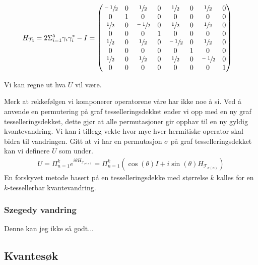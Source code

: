         \begin{align*}
            H_{\mathcal{T}_3} & = 2\Sigma_{i=1}^5\gamma_i\gamma_i^*-I = \begin{pmatrix}
                \sfrac{-1}{2} & 0 & \sfrac{1}{2} & 0 & \sfrac{1}{2} & 0 & \sfrac{1}{2} & 0 \\
                0 & 1 & 0 & 0 & 0 & 0 & 0 & 0 \\
                \sfrac{1}{2} & 0 & \sfrac{-1}{2} & 0 & \sfrac{1}{2} & 0 & \sfrac{1}{2} & 0 \\
                0 & 0 & 0 & 1 & 0 & 0 & 0 & 0 \\
                \sfrac{1}{2} & 0 & \sfrac{1}{2} & 0 & \sfrac{-1}{2} & 0 & \sfrac{1}{2} & 0 \\
                0 & 0 & 0 & 0 & 0 & 1 & 0 & 0 \\
                \sfrac{1}{2} & 0 & \sfrac{1}{2} & 0 & \sfrac{1}{2} & 0 & \sfrac{-1}{2} & 0 \\
                0 & 0 & 0 & 0 & 0 & 0 & 0 & 1
            \end{pmatrix}
        \end{align*}

        Vi kan regne ut hva $U$ vil være.

        Merk at rekkefølgen vi komponerer operatorene våre har ikke noe å si. Ved å anvende en permutering på graf tesselleringsdekket ender vi opp med en ny graf tesselleringsdekket, dette gjør at alle permutasjoner gir opphav til en ny gyldig kvantevandring. Vi kan i tillegg vekte hvor mye hver hermitiske operator skal bidra til vandringen. Gitt at vi har en permutasjon $\sigma$ på graf tesselleringsdekket kan vi definere $U$ som under.
        \begin{align*}
            U=\Pi_{n=1}^ke^{i\theta H_{\mathcal{T}_{\sigma(n)}}}=\Pi_{n=1}^k(\cos(\theta)I+i\sin(\theta)H_{\mathcal{T}_{\sigma(n)}})
        \end{align*}
        En forskyvet metode basert på en tesselleringsdekke med størrelse $k$ kalles for en $k$-tessellerbar kvantevandring.

    \subsubsection*{Szegedy vandring}
        
        Denne kan jeg ikke så godt...

\subsection{Kvantesøk}

